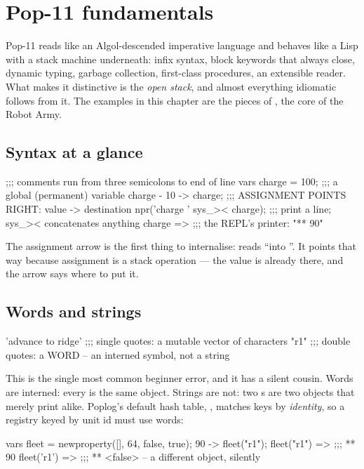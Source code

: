 \chapter{Pop-11 fundamentals}

Pop-11 reads like an Algol-descended imperative language and behaves like a
Lisp with a stack machine underneath: infix syntax, block keywords that
always close, dynamic typing, garbage collection, first-class procedures, an
extensible reader. What makes it distinctive is the \emph{open stack}, and
almost everything idiomatic follows from it. The examples in this chapter
are the pieces of , the core of the Robot Army.

\section{Syntax at a glance}

\begin{pop}
;;; comments run from three semicolons to end of line
vars charge = 100;            ;;; a global (permanent) variable
charge - 10 -> charge;        ;;; ASSIGNMENT POINTS RIGHT: value -> destination
npr('charge ' sys_>< charge); ;;; print a line; sys_>< concatenates anything
charge =>                     ;;; the REPL's printer: "** 90"
\end{pop}

The assignment arrow is the first thing to internalise:  reads
``into ''. It points that way because assignment is a stack
operation --- the value is already there, and the arrow says where to put it.

\section{Words and strings}

\begin{pop}
'advance to ridge'   ;;; single quotes: a mutable vector of characters
"r1"                 ;;; double quotes: a WORD -- an interned symbol, not a string
\end{pop}

This is the single most common beginner error, and it has a silent cousin.
Words are interned: every  is the same object. Strings are
not: two s are two objects that merely print alike. Poplog's
default hash table, , matches keys by \emph{identity}, so a
registry keyed by unit id must use words:

\begin{pop}
vars fleet = newproperty([], 64, false, true);
90 -> fleet("r1");
fleet("r1") =>            ;;; ** 90
fleet('r1') =>            ;;; ** <false>  -- a different object, silently
\end{pop}

